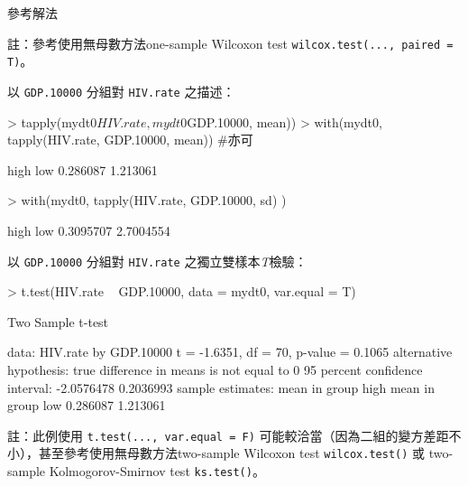 \documentclass[14pt, aspectratio=43]{beamer}
\begin{document}
\begin{frame}{參考解法}
\begin{minipage}{1\textwidth}
\tiny 註：參考使用無母數方法one-sample Wilcoxon test \verb+wilcox.test(..., paired = T)+。
\end{minipage}

\framebreak 

以 \verb+GDP.10000+ 分組對 \verb+HIV.rate+ 之描述：
\begin{RC}
> tapply(mydt0$HIV.rate, mydt0$GDP.10000, mean))
> with(mydt0, {tapply(HIV.rate, GDP.10000, mean)}) #亦可
\end{RC}
\begin{R}
    high      low 
0.286087 1.213061 
\end{R}
\begin{RC}
> with(mydt0, {tapply(HIV.rate, GDP.10000, sd)} )
\end{RC}
\begin{R}
     high       low 
0.3095707 2.7004554 
\end{R}

\framebreak

以 \verb+GDP.10000+ 分組對 \verb+HIV.rate+ 之獨立雙樣本\emph{T}檢驗：
\begin{RC}
> t.test(HIV.rate ~ GDP.10000,
         data = mydt0, var.equal = T)
\end{RC}
\begin{R}
	Two Sample t-test

data:  HIV.rate by GDP.10000
t = -1.6351, df = 70, p-value = 0.1065
alternative hypothesis: true difference in means is not equal to 0
95 percent confidence interval:
 -2.0576478  0.2036993
sample estimates:
mean in group high  mean in group low 
          0.286087           1.213061
\end{R}

\begin{minipage}{1\textwidth}
\tiny 註：此例使用 \verb+t.test(..., var.equal = F)+ 可能較洽當（因為二組的變方差距不小），甚至參考使用無母數方法two-sample Wilcoxon test \verb+wilcox.test()+ 或 two-sample Kolmogorov-Smirnov test \verb+ks.test()+。
\end{minipage}

\framebreak


\end{frame}
\end{document}
